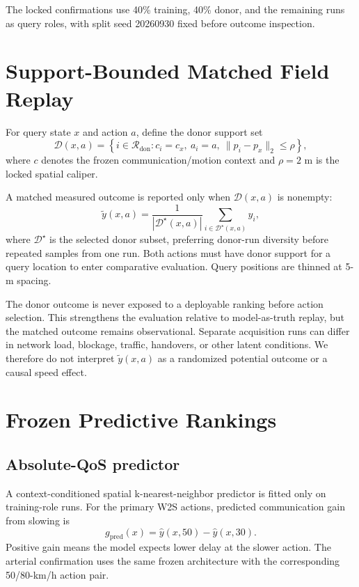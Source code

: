 \documentclass[journal]{IEEEtran}
\begin{document}
The locked confirmations use 40\% training, 40\% donor, and the remaining runs as query roles, with split seed 20260930 fixed before outcome inspection.

\section{Support-Bounded Matched Field Replay}
For query state $x$ and action $a$, define the donor support set
\begin{equation}
\mathcal D(x,a)=
\left\{
i\in\mathcal R_{\mathrm{don}}:
c_i=c_x,\ a_i=a,\ \|p_i-p_x\|_2\le \rho
\right\},
\end{equation}
where $c$ denotes the frozen communication/motion context and $\rho=2$ m is the locked spatial caliper.

A matched measured outcome is reported only when $\mathcal D(x,a)$ is nonempty:
\begin{equation}
\tilde y(x,a)
=
\frac{1}{|\mathcal D^\star(x,a)|}
\sum_{i\in\mathcal D^\star(x,a)}y_i,
\end{equation}
where $\mathcal D^\star$ is the selected donor subset, preferring donor-run diversity before repeated samples from one run. Both actions must have donor support for a query location to enter comparative evaluation. Query positions are thinned at 5-m spacing.

The donor outcome is never exposed to a deployable ranking before action selection. This strengthens the evaluation relative to model-as-truth replay, but the matched outcome remains observational. Separate acquisition runs can differ in network load, blockage, traffic, handovers, or other latent conditions. We therefore do not interpret $\tilde y(x,a)$ as a randomized potential outcome or a causal speed effect.

\section{Frozen Predictive Rankings}
\subsection{Absolute-QoS predictor}
A context-conditioned spatial k-nearest-neighbor predictor is fitted only on training-role runs. For the primary W2S actions, predicted communication gain from slowing is
\begin{equation}
g_{\mathrm{pred}}(x)
=
\hat y(x,50)-\hat y(x,30).
\end{equation}
Positive gain means the model expects lower delay at the slower action. The arterial confirmation uses the same frozen architecture with the corresponding 50/80-km/h action pair.
\end{document}
